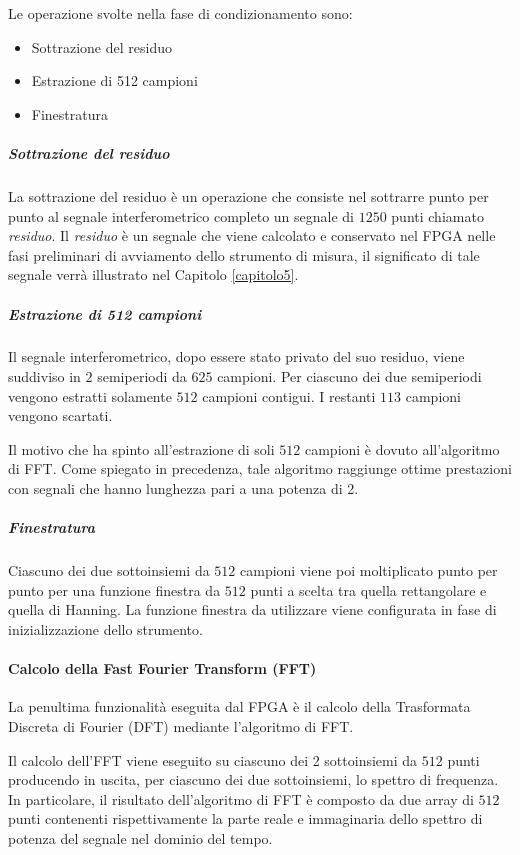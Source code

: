 Le operazione svolte nella fase di condizionamento sono:
\begin{itemize}
	\item Sottrazione del residuo
	\item Estrazione di 512 campioni
	\item Finestratura
\end{itemize}

\subparagraph{Sottrazione del residuo}
La sottrazione del residuo è un operazione che consiste nel sottrarre punto per punto al segnale interferometrico completo un segnale di $1250$ punti chiamato \textit{residuo}. Il \textit{residuo} è un segnale che viene calcolato e conservato nel FPGA nelle fasi preliminari di avviamento dello strumento di misura, il significato di tale segnale verrà illustrato nel Capitolo \ref{capitolo5}.

\subparagraph{Estrazione di 512 campioni}
Il segnale interferometrico, dopo essere stato privato del suo residuo, viene suddiviso in $2$ semiperiodi da $625$ campioni. Per ciascuno dei due semiperiodi vengono estratti solamente $512$ campioni contigui. I restanti $113$ campioni vengono scartati. 

Il motivo che ha spinto all'estrazione di soli $512$ campioni è dovuto all'algoritmo di FFT. Come spiegato in precedenza, tale algoritmo raggiunge ottime prestazioni con segnali che hanno lunghezza pari a una potenza di 2.

\subparagraph{Finestratura}
Ciascuno dei due sottoinsiemi da $512$ campioni viene poi moltiplicato punto per punto per una funzione finestra da $512$ punti a scelta tra quella rettangolare e quella di Hanning. La funzione finestra da utilizzare viene configurata in fase di inizializzazione dello strumento.

\paragraph{Calcolo della Fast Fourier Transform (FFT)}
La penultima funzionalità eseguita dal FPGA è il calcolo della Trasformata Discreta di Fourier (DFT) mediante l'algoritmo di FFT.

Il calcolo dell'FFT viene eseguito su ciascuno dei 2 sottoinsiemi da $512$ punti producendo in uscita, per ciascuno dei due sottoinsiemi, lo spettro di frequenza. In particolare, il risultato dell'algoritmo di FFT è composto da due array di $512$ punti contenenti rispettivamente la parte reale e immaginaria dello spettro di potenza del segnale nel dominio del tempo.

